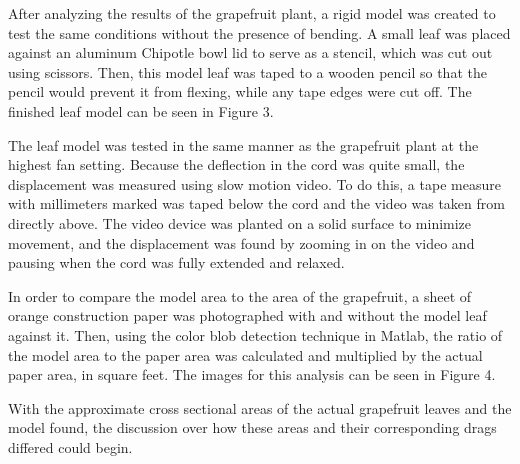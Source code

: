 \documentclass{article}
\begin{document}
After analyzing the results of the grapefruit plant, a rigid model was created to test the same conditions without the presence of bending. A small leaf was placed against an aluminum Chipotle bowl lid to serve as a stencil, which was cut out using scissors. Then, this model leaf was taped to a wooden pencil so that the pencil would prevent it from flexing, while any tape edges were cut off. The finished leaf model can be seen in 
Figure 3.

The leaf model was tested in the same manner as the grapefruit plant at the highest fan setting. Because the deflection in the cord was quite small, the displacement was measured using slow motion video. To do this, a tape measure with millimeters marked was taped below the cord and the video was taken from directly above. The video device was planted on a solid surface to minimize movement, and the displacement was found by zooming in on the video and pausing when the cord was fully extended and relaxed. 

In order to compare the model area to the area of the grapefruit, a sheet of orange construction paper was photographed with and without the model leaf against it. Then, using the color blob detection technique in Matlab, the ratio of the model area to the paper area was calculated and multiplied by the actual paper area, in square feet. The images for this analysis can be seen in Figure 4.

With the approximate cross sectional areas of the actual grapefruit leaves and the model found, the discussion over how these areas and their corresponding drags differed could begin.
\end{document}
